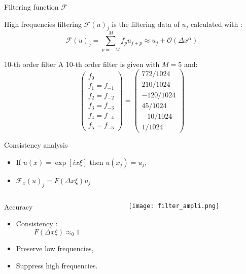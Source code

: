 \documentclass[11pt]{beamer}
\begin{document}
\begin{frame}{Filtering function $\mathcal{F}$}

\begin{block}{High frequencies filtering}
$\mathcal{F}(u)_j$ is the filtering data of $u_j$ calculated with :
\begin{equation}
\mathcal{F}(u)_j = \sum_{p=-M}^M f_{p} u_{j+p}\approx u_j + \mathcal{O}\left( \Delta x^{\alpha} \right)
\end{equation}
\end{block}
\begin{block}{10-th order filter}
A 10-th order filter is given with $M=5$ and:
$$\begin{pmatrix}
f_0\\ f_1 = f_{-1}\\ f_2 = f_{-2} \\ f_3=f_{-3} \\ f_4=f_{-4} \\ f_5 = f_{-5}
\end{pmatrix}=\begin{pmatrix}
772/1024\\ 210/1024\\ -120/1024\\ 45/1024\\ -10/1024\\ 1/1024
\end{pmatrix}$$
\end{block}
\end{frame}




\begin{frame}{Consistency analysis}
\begin{itemize}
\item If $u(x)=\exp \left[ i x \xi \right]$ then $u(x_j)=u_j$,
\item $\mathcal{F}_x(u)_j = F \left( \Delta x \xi \right) u_j$
\end{itemize}

\begin{columns}
\begin{block}{Accuracy}
\begin{itemize}
\item Consistency :
\begin{equation*}
F \left( \Delta x \xi \right) \approx_0 1
\end{equation*}
\item Preserve low frequencies,
\item Suppress high frequencies.
\end{itemize}
\end{block}


\begin{center}
\begin{figure}
\texttt{[image: filter\_ampli.png]}
\end{figure}
\end{center}
\end{columns}
\end{frame}
\end{document}
